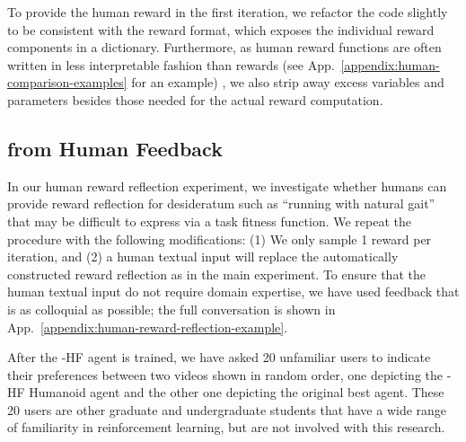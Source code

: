 To provide the human reward in the first iteration, we refactor the code slightly to be consistent with the \ourmethod reward format, which exposes the individual reward components in a dictionary. Furthermore, as human reward functions are often written in less interpretable fashion than \ourmethod rewards (see App.~\ref{appendix:human-comparison-examples} for an example) , we also strip away excess variables and parameters besides those needed for the actual reward computation.


\subsection{\ourmethod from Human Feedback}
\label{appendix:eureka-rlhf-details}

In our human reward reflection experiment, we investigate whether humans can provide reward reflection for desideratum such as ``running with natural gait'' that may be difficult to express via a task fitness function. We repeat the \ourmethod procedure with the following modifications: (1) We only sample 1 reward per iteration, and (2) a human textual input will replace the automatically constructed reward reflection as in the main experiment. To ensure that the human textual input do not require domain expertise, we have used feedback that is as colloquial as possible; the full conversation is shown in App.~\ref{appendix:human-reward-reflection-example}.

After the \ourmethod-HF agent is trained, we have asked 20 unfamiliar users to indicate their preferences between two videos shown in random order, one depicting the \ourmethod-HF Humanoid agent and the other one depicting the original best \ourmethod agent. These 20 users are other graduate and undergraduate students that have a wide range of familiarity in reinforcement learning, but are not involved with this research. 


\subsection{}
\label{appendix:computation-resources}

